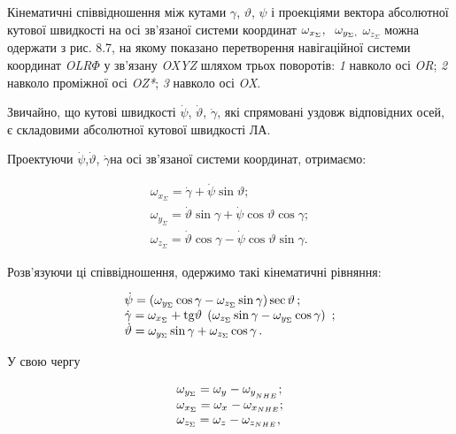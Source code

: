 Кінематичні співвідношення між кутами $\gamma$, $\vartheta$, $\psi$ і проекціями вектора абсолютної кутової 
швидкості на осі зв'язаної системи координат $\omega_{x_{\Sigma } } ,{\rm \; }\, 
\, \omega_{y_{\Sigma } ,} $ $\omega_{z_{\Sigma } } $ можна одержати з рис.  8.7, 
на якому показано перетворення навігаційної системи координат \textit{OLR$\Phi $ }у 
зв'язану \textit{OXYZ} шляхом трьох поворотів: \textit{1}   навколо осі \textit{OR}; \textit{2}  
навколо проміжної осі \textit{OZ*}; \textit{3}  навколо осі \textit{OX}.

 Звичайно, що кутові швидкості $\dot{\psi }$, $\dot{\vartheta }$, $\dot{\gamma }$, 
які спрямовані уздовж відповідних осей, є складовими абсолютної кутової швидкості 
ЛА.

 Проектуючи $\dot{\psi }$,$\dot{\vartheta }$, $\dot{\gamma }$на осі зв'язаної системи 
координат, отримаємо:

\[\begin{array}{l} {\omega_{x_{\Sigma } } =\dot{\gamma }+\dot{\psi }\sin \vartheta 
;} \\ {\omega_{y_{\Sigma } } =\dot{\vartheta }\sin \gamma +\dot{\psi }\cos \vartheta 
\cos \gamma ;} \\ {\omega_{z_{\Sigma } } =\dot{\vartheta }\cos \gamma -\dot{\psi 
}\cos \vartheta \sin \gamma .} \end{array}\] 

Розв'язуючи ці співвідношення, одержимо такі кінематичні рівняння:

\[\begin{array}{l} {\dot{\psi }=\left(\omega_{y_{\Sigma } } \cos \gamma -\omega 
_{z_{\Sigma } } \sin \gamma \right)\sec \vartheta \, ;} \\ {\dot{\gamma }=\omega 
_{x_{\Sigma } } +{\rm tg}\vartheta {\rm \; }\left(\omega_{z_{\Sigma } } \sin \gamma 
-\omega_{y_{\Sigma } } \cos \gamma \right)\, \, ;} \\ {\dot{\vartheta }=\omega_{y_{
\Sigma } } \sin \gamma +\omega_{z_{\Sigma }} \cos \gamma \, .} \end{array}\] 

У свою чергу 

\[\begin{array}{l} {\omega_{y_{\Sigma } } =\omega_{y_{{\rm }} } -\omega_{y_{_{NHE} 
} } ;} \\ {\omega_{x_{\Sigma } } =\omega_{x_{{\rm }} } -\omega_{x_{NHE} } ;} \\ 
{\omega_{z_{\Sigma } } =\omega_{z_{{\rm }} } -\omega_{z_{NHE} } ,} \end{array}\] 

